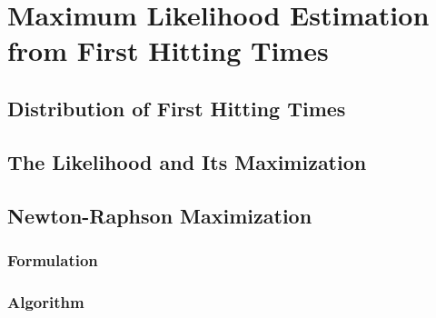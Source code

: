 \chapter{Maximum Likelihood Estimation from First Hitting Times}
\section{Distribution of First Hitting Times}
\section{The Likelihood and Its Maximization}
\section{Newton-Raphson Maximization}
\subsection{Formulation}
\subsection{Algorithm}
